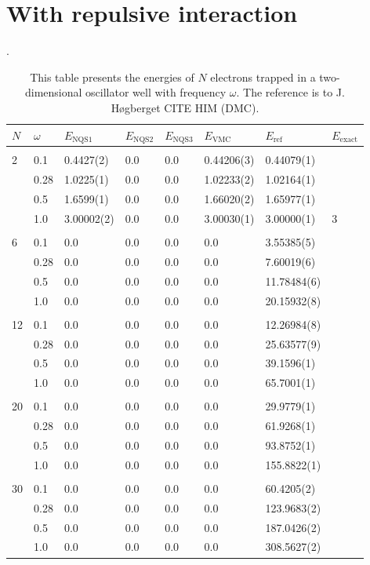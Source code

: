 \section{With repulsive interaction}
\begin{table} [H]
	\caption{This table presents the energies of $N$ electrons trapped in a two-dimensional oscillator well with frequency $\omega$. The reference is to J. Høgberget CITE HIM (DMC). }. 
	\begin{tabularx}{\textwidth}{l:l|XXXXXX} \hline\hline
		\label{tab:quantumdotswinteraction2D}
		$N$ & $\omega$ & $E_{\text{NQS1}}$ & $E_{\text{NQS2}}$ & $E_{\text{NQS3}}$ & $E_{\text{VMC}}$ & $E_{\text{ref}} $ & $E_{\text{exact}}$ \\ \hline \\
		2 & 0.1 & 0.4427(2) & 0.0 & 0.0 & 0.44206(3) & 0.44079(1) & \\ 
		& 0.28 & 1.0225(1) & 0.0 & 0.0 & 1.02233(2) & 1.02164(1) & \\
		& 0.5 & 1.6599(1) & 0.0 & 0.0 & 1.66020(2) & 1.65977(1)  \\
		& 1.0 & 3.00002(2) & 0.0 & 0.0 & 3.00030(1) & 3.00000(1) & 3  \\ \hdashline \\
		
		6 & 0.1 & 0.0 & 0.0 & 0.0 & 0.0 & 3.55385(5) \\ 
		& 0.28 & 0.0 & 0.0 & 0.0 & 0.0 & 7.60019(6) \\
		& 0.5 & 0.0 & 0.0 & 0.0 & 0.0 & 11.78484(6) \\
		& 1.0 & 0.0 & 0.0 & 0.0 & 0.0 & 20.15932(8) \\ \hdashline \\
		
		12 & 0.1 & 0.0 & 0.0 & 0.0 & 0.0 & 12.26984(8) \\ 
		& 0.28 & 0.0 & 0.0 & 0.0 & 0.0 & 25.63577(9) \\
		& 0.5 & 0.0 & 0.0 & 0.0 & 0.0 & 39.1596(1) \\
		& 1.0 & 0.0 & 0.0 & 0.0 & 0.0 & 65.7001(1) \\ \hdashline \\
		
		20 & 0.1 & 0.0 & 0.0 & 0.0 & 0.0 & 29.9779(1) \\ 
		& 0.28 & 0.0 & 0.0 & 0.0 & 0.0 & 61.9268(1) \\
		& 0.5 & 0.0 & 0.0 & 0.0 & 0.0 & 93.8752(1) \\
		& 1.0 & 0.0 & 0.0 & 0.0 & 0.0 & 155.8822(1) \\ \hdashline \\
		
		30 & 0.1 & 0.0 & 0.0 & 0.0 & 0.0 & 60.4205(2)\\ 
		& 0.28 & 0.0 & 0.0 & 0.0 & 0.0 & 123.9683(2)\\
		& 0.5 & 0.0 & 0.0 & 0.0 & 0.0 & 187.0426(2)\\
		& 1.0 & 0.0 & 0.0 & 0.0 & 0.0 & 308.5627(2)\\ \hline\hline
	\end{tabularx}
\end{table}


